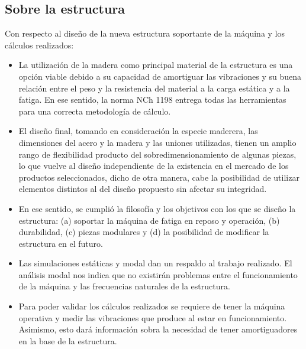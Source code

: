 \subsection{Sobre la estructura}
Con respecto al diseño de la nueva estructura soportante de la máquina y los cálculos realizados:
\begin{itemize}
	\item La utilización de la madera como principal material de la estructura es una opción viable debido a su capacidad de amortiguar las vibraciones y su buena relación entre el peso y la resistencia del material a la carga estática y a la fatiga. En ese sentido, la norma NCh 1198 entrega todas las herramientas para una correcta metodología de cálculo.
	\item El diseño final, tomando en consideración la especie maderera, las dimensiones del acero y la madera y las uniones utilizadas, tienen un amplio rango de flexibilidad producto del sobredimensionamiento de algunas piezas, lo que vuelve al diseño independiente de la existencia en el mercado de los productos seleccionados, dicho de otra manera, cabe la posibilidad de utilizar elementos distintos al del diseño propuesto sin afectar su integridad.
	\item En ese sentido, se cumplió la filosofía y los objetivos con los que se diseño la estructura: (a) soportar la máquina de fatiga en reposo y operación, (b) durabilidad, (c) piezas modulares y (d) la posibilidad de modificar la estructura en el futuro.
	\item Las simulaciones estáticas y modal dan un respaldo al trabajo realizado. El análisis modal nos indica que no existirán problemas entre el funcionamiento de la máquina y las frecuencias naturales de la estructura.
	\item Para poder validar los cálculos realizados se requiere de tener la máquina operativa y medir las vibraciones que produce al estar en funcionamiento. Asimismo, esto dará información sobra la necesidad de tener amortiguadores en la base de la estructura.
\end{itemize}

